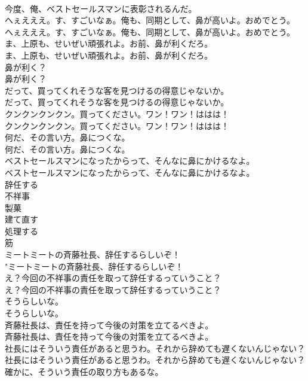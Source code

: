 \documentclass[8pt]{extreport}
\begin{document}
\begin{CJK}{UTF8}{min}
\\	今度、俺、ベストセールスマンに表彰されるんだ。 
\\	へぇえええ。す、すごいなぁ。俺も、同期として、鼻が高いよ。おめでとう。	
\\	へぇえええ。す、すごいなぁ。俺も、同期として、鼻が高いよ。おめでとう。 
\\	ま、上原も、せいぜい頑張れよ。お前、鼻が利くだろ。	
\\	ま、上原も、せいぜい頑張れよ。お前、鼻が利くだろ。 
\\	鼻が利く？	
\\	鼻が利く？ 
\\	だって、買ってくれそうな客を見つけるの得意じゃないか。	
\\	だって、買ってくれそうな客を見つけるの得意じゃないか。 
\\	クンクンクンクン。買ってください。ワン！ワン！ははは！	
\\	クンクンクンクン。買ってください。ワン！ワン！ははは！ 
\\	何だ、その言い方。鼻につくな。	
\\	何だ、その言い方。鼻につくな。 
\\	ベストセールスマンになったからって、そんなに鼻にかけるなよ。	
\\	ベストセールスマンになったからって、そんなに鼻にかけるなよ。 
\\	辞任する
\\	不祥事
\\	製菓
\\	建て直す
\\	処理する
\\	筋
\\	ミートミートの斉藤社長、辞任するらしいぞ！	
\\	"ミートミートの斉藤社長、辞任するらしいぞ！ 
\\	え？今回の不祥事の責任を取って辞任するっていうこと？	
\\	え？今回の不祥事の責任を取って辞任するっていうこと？ 
\\	そうらしいな。	
\\	そうらしいな。 
\\	斉藤社長は、責任を持って今後の対策を立てるべきよ。	
\\	斉藤社長は、責任を持って今後の対策を立てるべきよ。 
\\	社長にはそういう責任があると思うわ。それから辞めても遅くないんじゃない？	
\\	社長にはそういう責任があると思うわ。それから辞めても遅くないんじゃない？ 
\\	確かに、そういう責任の取り方もあるな。	

\end{CJK}
\end{document}
